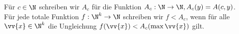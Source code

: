 \documentclass{article}
\begin{document}



Für $c \in \N$ schreiben wir $A_c$ für die Funktion $A_c: \N \to \N, A_c(y) = A(c,y)$. \\
Für jede totale Funktion $f: \N^k \to \N$ schreiben wir $f < A_c$, wenn für alle
$\vv{x} \in \N^k$ die Ungleichung $f(\vv{x}) < A_c(\max \vv{x})$ gilt.



\end{document}
